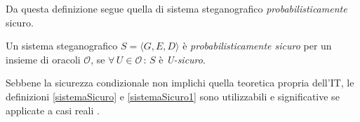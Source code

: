 \noindent Da questa definizione segue quella di sistema steganografico \textit{probabilisticamente} sicuro.
\begin{defn} \label{sistemaSicuro1}  Un sistema steganografico $S=\langle G,E,D \rangle$ è \textit{probabilisticamente sicuro} per un insieme di oracoli $\mathcal{O}$, se $\forall \, U \in \mathcal{O} \, : \, S$ è \textit{U-sicuro}.
\end{defn}
\noindent Sebbene la sicurezza condizionale non implichi quella teoretica propria dell'IT, le definizioni \ref{sistemaSicuro} e \ref{sistemaSicuro1} sono utilizzabili e significative se applicate a casi reali \cite{sec}. 	  